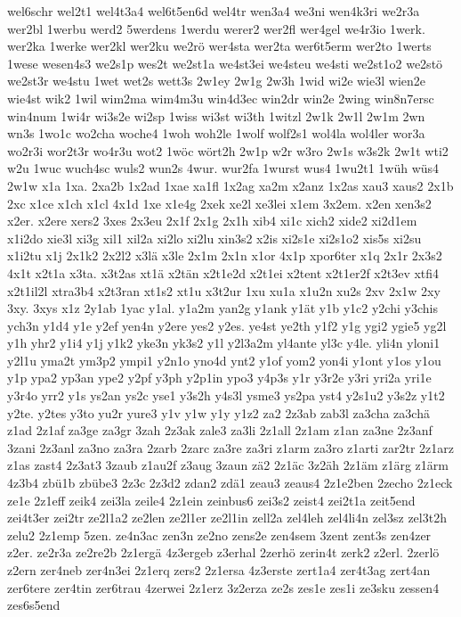 {wel6schr
wel2t1
wel4t3a4
wel6t5en6d
wel4tr
wen3a4
we3ni
wen4k3ri
we2r3a
wer2bl
1werbu
werd2
5werdens
1werdu
werer2
wer2fl
wer4gel
we4r3io
1werk.
wer2ka
1werke
wer2kl
wer2ku
we2rö
wer4sta
wer2ta
wer6t5erm
wer2to
1werts
1wese
wesen4s3
we2s1p
wes2t
we2st1a
we4st3ei
we4steu
we4sti
we2st1o2
we2stö
we2st3r
we4stu
1wet
wet2s
wett3s
2w1ey
2w1g
2w3h
1wid
wi2e
wie3l
wien2e
wie4st
wik2
1wil
wim2ma
wim4m3u
win4d3ec
win2dr
win2e
2wing
win8n7ersc
win4num
1wi4r
wi3s2e
wi2sp
1wiss
wi3st
wi3th
1witzl
2w1k
2w1l
2w1m
2wn
wn3s
1wo1c
wo2cha
woche4
1woh
woh2le
1wolf
wolf2s1
wol4la
wol4ler
wor3a
wo2r3i
wor2t3r
wo4r3u
wot2
1wöc
wört2h
2w1p
w2r
w3ro
2w1s
w3s2k
2w1t
wti2
w2u
1wuc
wuch4sc
wuls2
wun2s
4wur.
wur2fa
1wurst
wus4
1wu2t1
1wüh
wüs4
2w1w
x1a
1xa.
2xa2b
1x2ad
1xae
xa1fl
1x2ag
xa2m
x2anz
1x2as
xau3
xaus2
2x1b
2xc
x1ce
x1ch
x1cl
4x1d
1xe
x1e4g
2xek
xe2l
xe3lei
x1em
3x2em.
x2en
xen3s2
x2er.
x2ere
xers2
3xes
2x3eu
2x1f
2x1g
2x1h
xib4
xi1c
xich2
xide2
xi2d1em
x1i2do
xie3l
xi3g
xil1
xil2a
xi2lo
xi2lu
xin3s2
x2is
xi2s1e
xi2s1o2
xis5s
xi2su
x1i2tu
x1j
2x1k2
2x2l2
x3lä
x3le
2x1m
2x1n
x1or
4x1p
xpor6ter
x1q
2x1r
2x3s2
4x1t
x2t1a
x3ta.
x3t2as
xt1ä
x2tän
x2t1e2d
x2t1ei
x2tent
x2t1er2f
x2t3ev
xtfi4
x2t1il2l
xtra3b4
x2t3ran
xt1s2
xt1u
x3t2ur
1xu
xu1a
x1u2n
xu2s
2xv
2x1w
2xy
3xy.
3xys
x1z
2y1ab
1yac
y1al.
y1a2m
yan2g
y1ank
y1ät
y1b
y1c2
y2chi
y3chis
ych3n
y1d4
y1e
y2ef
yen4n
y2ere
yes2
y2es.
ye4st
ye2th
y1f2
y1g
ygi2
ygie5
yg2l
y1h
yhr2
y1i4
y1j
y1k2
yke3n
yk3s2
y1l
y2l3a2m
yl4ante
yl3c
y4le.
yli4n
yloni1
y2l1u
yma2t
ym3p2
ympi1
y2n1o
yno4d
ynt2
y1of
yom2
yon4i
y1ont
y1os
y1ou
y1p
ypa2
yp3an
ype2
y2pf
y3ph
y2p1in
ypo3
y4p3s
y1r
y3r2e
y3ri
yri2a
yri1e
y3r4o
yrr2
y1s
ys2an
ys2c
yse1
y3s2h
y4s3l
ysme3
ys2pa
yst4
y2s1u2
y3s2z
y1t2
y2te.
y2tes
y3to
yu2r
yure3
y1v
y1w
y1y
y1z2
za2
2z3ab
zab3l
za3cha
za3chä
z1ad
2z1af
za3ge
za3gr
3zah
2z3ak
zale3
za3li
2z1all
2z1am
z1an
za3ne
2z3anf
3zani
2z3anl
za3no
za3ra
2zarb
2zarc
za3re
za3ri
z1arm
za3ro
z1arti
zar2tr
2z1arz
z1as
zast4
2z3at3
3zaub
z1au2f
z3aug
3zaun
zä2
2z1äc
3z2äh
2z1äm
z1ärg
z1ärm
4z3b4
zbü1b
zbübe3
2z3c
2z3d2
zdan2
zdä1
zeau3
zeaus4
2z1e2ben
2zecho
2z1eck
ze1e
2z1eff
zeik4
zei3la
zeile4
2z1ein
zeinbus6
zei3s2
zeist4
zei2t1a
zeit5end
zei4t3er
zei2tr
ze2l1a2
ze2len
ze2l1er
ze2l1in
zell2a
zel4leh
zel4li4n
zel3sz
zel3t2h
zelu2
2z1emp
5zen.
ze4n3ac
zen3n
ze2no
zens2e
zen4sem
3zent
zent3s
zen4zer
z2er.
ze2r3a
ze2re2b
2z1ergä
4z3ergeb
z3erhal
2zerhö
zerin4t
zerk2
z2erl.
2zerlö
z2ern
zer4neb
zer4n3ei
2z1erq
zers2
2z1ersa
4z3erste
zert1a4
zer4t3ag
zert4an
zer6tere
zer4tin
zer6trau
4zerwei
2z1erz
3z2erza
ze2s
zes1e
zes1i
ze3sku
zessen4
zes6s5end
}
